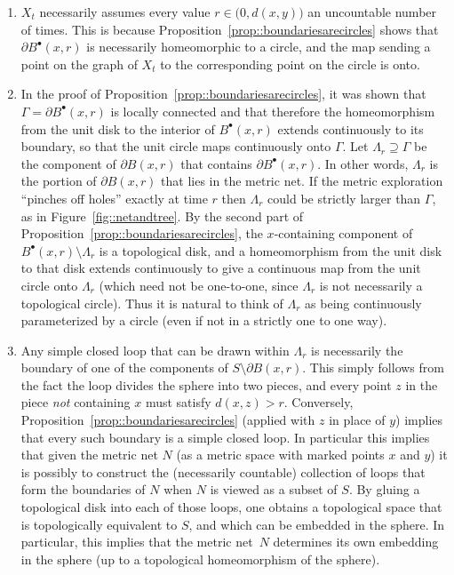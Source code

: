 \documentclass[JEP,XML,SOM,Unicode]{cedram}
\newcommand{\sbullet}{{\scriptscriptstyle\bullet}}
\theoremstyle{plain}
\numberwithin{theorem}{section}
\theoremstyle{definition}
\newcommand{\fb}[2]{B^\sbullet(#1,#2)}
\begin{document}
\begin{enumerate}
\item $X_t$ necessarily assumes every value $r \in \bigl( 0, d(x,y) \bigr)$ an uncountable number of times. This is because Proposition~\ref{prop::boundariesarecircles} shows that $\partial \fb{x}{r}$ is necessarily homeomorphic to a circle, and the map sending a point on the graph of $X_t$ to the corresponding point on the circle is onto.
\item In the proof of Proposition~\ref{prop::boundariesarecircles}, it was shown that $\Gamma = \partial \fb{x}{r}$ is locally connected and that therefore the homeomorphism from the unit disk to the interior of $\fb{x}{r}$ extends continuously to its boundary, so that the unit circle maps continuously onto $\Gamma$. Let $\Lambda_r \supseteq \Gamma$ be the component of $\partial B(x,r)$ that contains $\partial \fb{x}{r}$. In other words, $\Lambda_r$ is the portion of $\partial B(x,r)$ that lies in the metric net. If the metric exploration ``pinches off holes'' exactly at time $r$ then $\Lambda_r$ could be strictly larger than $\Gamma$, as in Figure~\ref{fig::netandtree}. By the second part of Proposition~\ref{prop::boundariesarecircles}, the $x$-containing component of $\fb{x}{r} \setminus \Lambda_r$ is a topological disk, and a homeomorphism from the unit disk to that disk extends continuously to give a continuous map from the unit circle onto $\Lambda_r$ (which need not be one-to-one, since $\Lambda_r$ is not necessarily a topological circle). Thus it is natural to think of $\Lambda_r$ as being continuously parameterized by a circle (even if not in a strictly one to one way).
\item Any simple closed loop that can be drawn within $\Lambda_r$ is necessarily the boundary of one of the components of $S \setminus \partial B(x,r)$. This simply follows from the fact the loop divides the sphere into two pieces, and every point $z$ in the piece \emph{not} containing $x$ must satisfy $d(x,z) > r$. Conversely, Proposition~\ref{prop::boundariesarecircles} (applied with $z$ in place of $y$) implies that every such boundary is a simple closed loop. In particular this implies that given the metric net $N$ (as a metric space with marked points $x$ and $y$) it is possibly to construct the (necessarily countable) collection of loops that form the boundaries of $N$ when $N$ is viewed as a subset of $S$. By gluing a topological disk into each of those loops, one obtains a topological space that is topologically equivalent to $S$, and which can be embedded in the sphere. In particular, this implies that the metric net~$N$ determines its own embedding in the sphere (up to a topological homeomorphism of the sphere).

\end{enumerate}
\end{document}
